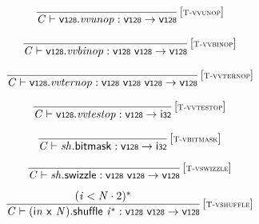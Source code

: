 $$
\begin{array}{@{}c@{}}\displaystyle
\frac{
}{
{\mathit{C}} \vdash \mathsf{v{\scriptstyle128}} . {\mathit{vvunop}} : \mathsf{v{\scriptstyle128}} \rightarrow \mathsf{v{\scriptstyle128}}
} \, {[\textsc{\scriptsize T{-}vvunop}]}
\qquad
\end{array}
$$

$$
\begin{array}{@{}c@{}}\displaystyle
\frac{
}{
{\mathit{C}} \vdash \mathsf{v{\scriptstyle128}} . {\mathit{vvbinop}} : \mathsf{v{\scriptstyle128}}~\mathsf{v{\scriptstyle128}} \rightarrow \mathsf{v{\scriptstyle128}}
} \, {[\textsc{\scriptsize T{-}vvbinop}]}
\qquad
\end{array}
$$

$$
\begin{array}{@{}c@{}}\displaystyle
\frac{
}{
{\mathit{C}} \vdash \mathsf{v{\scriptstyle128}} . {\mathit{vvternop}} : \mathsf{v{\scriptstyle128}}~\mathsf{v{\scriptstyle128}}~\mathsf{v{\scriptstyle128}} \rightarrow \mathsf{v{\scriptstyle128}}
} \, {[\textsc{\scriptsize T{-}vvternop}]}
\qquad
\end{array}
$$

$$
\begin{array}{@{}c@{}}\displaystyle
\frac{
}{
{\mathit{C}} \vdash \mathsf{v{\scriptstyle128}} . {\mathit{vvtestop}} : \mathsf{v{\scriptstyle128}} \rightarrow \mathsf{i{\scriptstyle32}}
} \, {[\textsc{\scriptsize T{-}vvtestop}]}
\qquad
\end{array}
$$

$$
\begin{array}{@{}c@{}}\displaystyle
\frac{
}{
{\mathit{C}} \vdash {\mathit{sh}}.\mathsf{bitmask} : \mathsf{v{\scriptstyle128}} \rightarrow \mathsf{i{\scriptstyle32}}
} \, {[\textsc{\scriptsize T{-}vbitmask}]}
\qquad
\end{array}
$$

$$
\begin{array}{@{}c@{}}\displaystyle
\frac{
}{
{\mathit{C}} \vdash {\mathit{sh}}.\mathsf{swizzle} : \mathsf{v{\scriptstyle128}}~\mathsf{v{\scriptstyle128}} \rightarrow \mathsf{v{\scriptstyle128}}
} \, {[\textsc{\scriptsize T{-}vswizzle}]}
\qquad
\end{array}
$$

$$
\begin{array}{@{}c@{}}\displaystyle
\frac{
({\mathit{i}} < {\mathit{N}} \cdot 2)^\ast
}{
{\mathit{C}} \vdash ({\mathsf{i}}{{\mathit{n}}}~\mathsf{x}~{\mathit{N}}).\mathsf{shuffle}~{{\mathit{i}}^\ast} : \mathsf{v{\scriptstyle128}}~\mathsf{v{\scriptstyle128}} \rightarrow \mathsf{v{\scriptstyle128}}
} \, {[\textsc{\scriptsize T{-}vshuffle}]}
\qquad
\end{array}
$$

